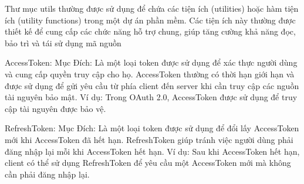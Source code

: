Thư mục utils thường được sử dụng để chứa các tiện ích (utilities) hoặc hàm tiện ích (utility functions) trong một dự án phần mềm.
Các tiện ích này thường được thiết kế để cung cấp các chức năng hỗ trợ chung, giúp tăng cường khả năng đọc, bảo trì và tái sử dụng
mã nguồn

AccessToken:
Mục Đích: Là một loại token được sử dụng để xác thực người dùng và cung cấp quyền truy cập cho họ. AccessToken thường có thời hạn giới
hạn và được sử dụng để gửi yêu cầu từ phía client đến server khi cần truy cập các nguồn tài nguyên bảo mật.
Ví dụ: Trong OAuth 2.0, AccessToken được sử dụng để truy cập tài nguyên được bảo vệ.

RefreshToken:
Mục Đích: Là một loại token được sử dụng để đổi lấy AccessToken mới khi AccessToken đã hết hạn. RefreshToken giúp tránh việc người dùng 
phải đăng nhập lại mỗi khi AccessToken hết hạn.
Ví dụ: Sau khi AccessToken hết hạn, client có thể sử dụng RefreshToken để yêu cầu một AccessToken mới mà không cần phải đăng nhập lại.  